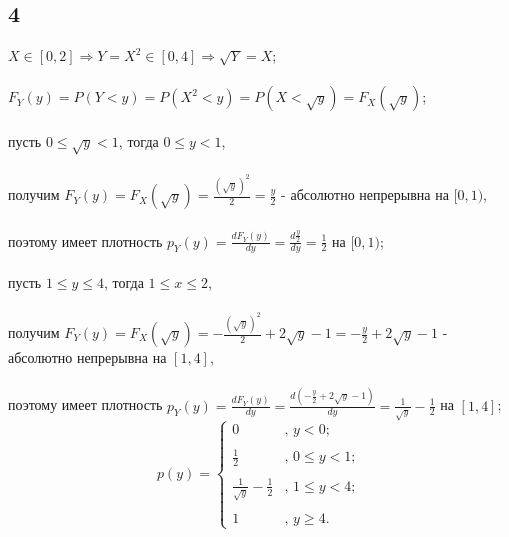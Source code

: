 \documentclass[a4paper]{article}
\begin{document}
\begin{large}
		\subsection*{4}
		$X \in [0,2] \Rightarrow Y=X^2 \in [0, 4] \Rightarrow \sqrt{Y}=X$;\\
		\\
		$F_Y(y)=P(Y<y)=P(X^2<y)=P(X< \sqrt{y})=F_X(\sqrt{y})$;\\
		\\
		пусть $0 \le \sqrt{y}<1$, тогда $0 \le y < 1$,\\
		\\
		получим $F_Y(y)=F_X(\sqrt{y})=\frac{(\sqrt{y})^2}{2}=\frac{y}{2}$ - абсолютно непрерывна на $[0,1)$,\\
		\\
		поэтому имеет плотность $p_Y(y)=\frac{dF_Y(y)}{dy}=\frac{d\frac{y}{2}}{dy}=\frac{1}{2}$ на $[0,1)$;\\
		\\
		пусть $1 \le y \le 4$, тогда $1 \le x \le 2$,\\
		\\
		получим $F_Y(y)=F_X(\sqrt{y})=-\frac{(\sqrt{y})^2}{2}+2\sqrt{y}-1=-\frac{y}{2}+2\sqrt{y}-1$ - абсолютно непрерывна на $[1,4]$,\\
		\\
		поэтому имеет плотность $p_Y(y)=\frac{dF_Y(y)}{dy}=\frac{d(-\frac{y}{2}+2\sqrt{y}-1)}{dy}=\frac{1}{\sqrt{y}}-\frac{1}{2}$ на $[1,4]$;\\
		\[ p(y) = \left\{ \begin{array}{ll}
			0 & \mbox{, $y<0$};\\
			\\
			\frac{1}{2} & \mbox{, $0\le y<1$};\\
			\\
			\frac{1}{\sqrt{y}}-\frac{1}{2} & \mbox{, $1 \le y < 4$};\\
			\\
			1 & \mbox{, $y \ge 4$}.\end{array} \right. \]
	\end{large}
\end{document}
